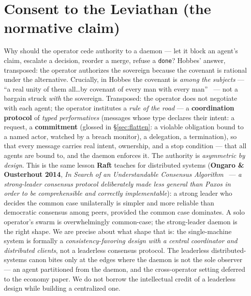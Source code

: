 \documentclass[11pt,a4paper]{article}
\theoremstyle{definition}
\theoremstyle{plain}
\newcounter{protocol}[section]
\begin{document}
\section{Consent to the Leviathan (the normative claim)}\label{sec:authority}
Why should the operator cede authority to a daemon --- let it block an agent's
claim, escalate a decision, reorder a merge, refuse a \texttt{done}? Hobbes'
answer, transposed: the operator authorizes the sovereign because the covenant is
rational under the alternative. Crucially, in Hobbes the covenant is \emph{among the
subjects} --- ``a real unity of them all\ldots by covenant of every man with every
man''~ --- not a bargain struck \emph{with} the
sovereign. Transposed: the operator does not negotiate with each agent; the operator
institutes a \emph{rule of the road} --- a \textbf{coordination protocol} of
\emph{typed performatives} (messages whose type declares their intent: a request, a
\textbf{commitment} (glossed in \S\ref{sec:flatten}: a violable obligation bound to a named actor, watched by a breach monitor), a delegation, a termination), so that every message carries real intent,
ownership, and a stop condition --- that all agents are bound to, and the daemon
enforces it.
The authority is \emph{asymmetric by design}. This is the same lesson \textbf{Raft}
teaches for distributed systems (\textbf{Ongaro \& Ousterhout 2014},
\emph{In Search of an Understandable Consensus Algorithm}~ ---
\emph{a strong-leader consensus protocol deliberately made less general than Paxos
in order to be comprehensible and correctly implementable}): a strong leader who
decides the common case unilaterally is simpler and more reliable than democratic
consensus among peers, provided the common case dominates. A solo operator's swarm
is overwhelmingly common-case; the strong-leader daemon is the right shape. We are
precise about what shape that is: the single-machine system is formally a
\emph{consistency-favoring design with a central coordinator and distributed
clients}, not a leaderless consensus protocol. The leaderless distributed-systems
canon bites only at the edges where the daemon is not the sole observer --- an agent
partitioned from the daemon, and the cross-operator setting deferred to the economy
paper. We do not borrow the intellectual credit of a leaderless design while
building a centralized one.
\end{document}
